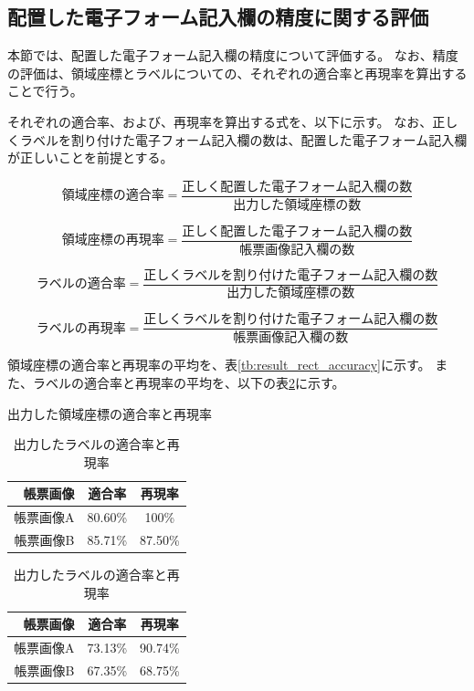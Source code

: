 \subsection{配置した電子フォーム記入欄の精度に関する評価}\label{subsec:evalue_accuracy}
本節では、配置した電子フォーム記入欄の精度について評価する。
なお、精度の評価は、領域座標とラベルについての、それぞれの適合率と再現率を算出することで行う。

それぞれの適合率、および、再現率を算出する式を、以下に示す。
なお、正しくラベルを割り付けた電子フォーム記入欄の数は、配置した電子フォーム記入欄が正しいことを前提とする。

\begin{equation}
    領域座標の適合率=\frac{正しく配置した電子フォーム記入欄の数}{出力した領域座標の数}
\end{equation}

\begin{equation}
    領域座標の再現率=\frac{正しく配置した電子フォーム記入欄の数}{帳票画像記入欄の数}
\end{equation}

\begin{equation}
    ラベルの適合率=\frac{正しくラベルを割り付けた電子フォーム記入欄の数}{出力した領域座標の数}
\end{equation}

\begin{equation}
    ラベルの再現率=\frac{正しくラベルを割り付けた電子フォーム記入欄の数}{帳票画像記入欄の数}
\end{equation}

領域座標の適合率と再現率の平均を、表\ref{tb:result_rect_accuracy}に示す。
また、ラベルの適合率と再現率の平均を、以下の表\ref{tb:result_label_accuracy}に示す。

\begin{table}[t]
    \centering
    \begin{minipage}[h]{0.47\linewidth}
        \caption{出力した領域座標の適合率と再現率}
        \label{tb:result_rect_accuracy}
        \centering
        \begin{tabular}{r|c|c}
            帳票画像 & 適合率 & 再現率 \\
            \hline \hline
            帳票画像A & 80.60\% & 100\% \\
            帳票画像B & 85.71\% & 87.50\% \\
        \end{tabular}
    \end{minipage}
    \begin{minipage}[h]{0.47\linewidth}
        \caption{出力したラベルの適合率と再現率}
        \label{tb:result_label_accuracy}
        \centering
        \begin{tabular}{r|c|c}
            帳票画像 & 適合率 & 再現率 \\
            \hline \hline
            帳票画像A & 73.13\% & 90.74\% \\
            帳票画像B & 67.35\% & 68.75\% \\
        \end{tabular}
    \end{minipage}
\end{table}

